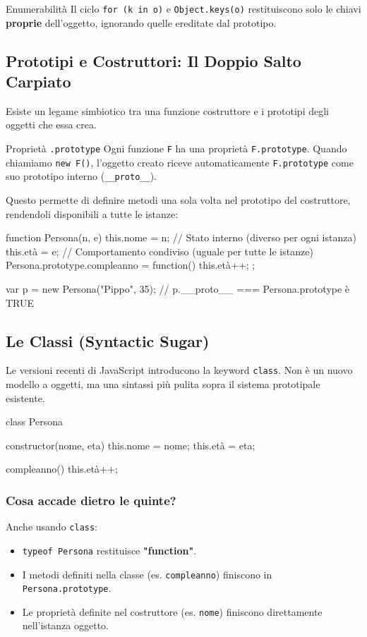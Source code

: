 \begin{warning}{Enumerabilità}
Il ciclo \texttt{for (k in o)} e \texttt{Object.keys(o)} restituiscono solo le chiavi \textbf{proprie} dell'oggetto, ignorando quelle ereditate dal prototipo.
\end{warning}

\subsection{Prototipi e Costruttori: Il Doppio Salto Carpiato}
Esiste un legame simbiotico tra una funzione costruttore e i prototipi degli oggetti che essa crea.

\begin{concept}{Proprietà \texttt{.prototype}}
Ogni funzione \texttt{F} ha una proprietà \texttt{F.prototype}. Quando chiamiamo \texttt{new F()}, l'oggetto creato riceve automaticamente \texttt{F.prototype} come suo prototipo interno (\texttt{\_\_proto\_\_}).
\end{concept}

Questo permette di definire metodi una sola volta nel prototipo del costruttore, rendendoli disponibili a tutte le istanze:
\begin{jsbox}[title={Pattern Costruttore + Prototipo}]
function Persona(n, e) {
    this.nome = n; // Stato interno (diverso per ogni istanza)
    this.età = e;
}
// Comportamento condiviso (uguale per tutte le istanze)
Persona.prototype.compleanno = function() { this.età++; };

var p = new Persona("Pippo", 35);
// p.__proto__ === Persona.prototype è TRUE
\end{jsbox}

\subsection{Le Classi (Syntactic Sugar)}
Le versioni recenti di JavaScript introducono la keyword \texttt{class}. Non è un nuovo modello a oggetti, ma una sintassi più pulita sopra il sistema prototipale esistente.

\begin{jsbox}[title={Sintassi Class}]
class Persona {
    constructor(nome, eta) {
        this.nome = nome;
        this.età = eta;
    }

    compleanno() {
        this.età++;
    }
}
\end{jsbox}

\subsubsection{Cosa accade dietro le quinte?}
Anche usando \texttt{class}:
\begin{itemize}
    \item \texttt{typeof Persona} restituisce \textbf{"function"}.
    \item I metodi definiti nella classe (es. \texttt{compleanno}) finiscono in \texttt{Persona.prototype}.
    \item Le proprietà definite nel costruttore (es. \texttt{nome}) finiscono direttamente nell'istanza oggetto.
\end{itemize}

